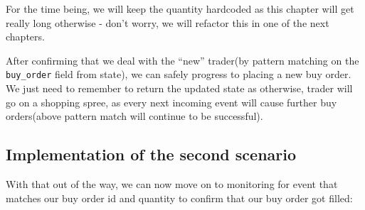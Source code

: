 \documentclass[
]{book}
\begin{document}
For the time being, we will keep the quantity hardcoded as this chapter will
get really long otherwise - don't worry, we will refactor this in one of the next chapters.

After confirming that we deal with the ``new'' trader(by pattern matching on the \texttt{buy\_order} field from state), we can safely progress to placing a new buy order. We just need to remember to return the updated state as otherwise, trader will go on a shopping spree, as every next incoming event will cause further buy orders(above pattern match will continue to be successful).

\hypertarget{implementation-of-the-second-scenario}{%
\subsection{Implementation of the second scenario}\label{implementation-of-the-second-scenario}}

With that out of the way, we can now move on to monitoring for event that matches our buy order id and quantity to confirm that our buy order got filled:
\end{document}

